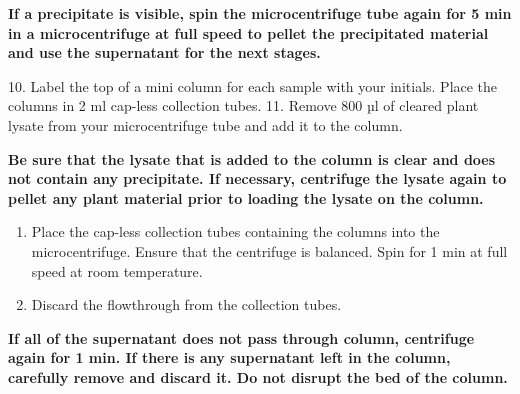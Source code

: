 \documentclass[]{book}
\providecommand{\tightlist}{%
  \setlength{\itemsep}{0pt}\setlength{\parskip}{0pt}}
\theoremstyle{definition}
\theoremstyle{definition}
\theoremstyle{definition}
\theoremstyle{remark}
\let\BeginKnitrBlock\begin \let\EndKnitrBlock\end
\begin{document}
\BeginKnitrBlock{rmdimportant}
\textbf{If a precipitate is visible, spin the microcentrifuge tube again
for 5 min in a microcentrifuge at full speed to pellet the precipitated
material and use the supernatant for the next stages.}
\EndKnitrBlock{rmdimportant} 10. Label the top of a mini column for each
sample with your initials. Place the columns in 2 ml cap-less collection
tubes. 11. Remove 800 µl of cleared plant lysate from your
microcentrifuge tube and add it to the column.

\BeginKnitrBlock{rmdimportant}
\textbf{Be sure that the lysate that is added to the column is clear and
does not contain any precipitate. If necessary, centrifuge the lysate
again to pellet any plant material prior to loading the lysate on the
column.}
\EndKnitrBlock{rmdimportant}

\begin{enumerate}
\def\labelenumi{\arabic{enumi}.}
\setcounter{enumi}{11}
\tightlist
\item
  Place the cap-less collection tubes containing the columns into the
  microcentrifuge. Ensure that the centrifuge is balanced. Spin for 1
  min at full speed at room temperature.
\item
  Discard the flowthrough from the collection tubes.
\end{enumerate}

\BeginKnitrBlock{rmdimportant}
\textbf{If all of the supernatant does not pass through column,
centrifuge again for 1 min. If there is any supernatant left in the
column, carefully remove and discard it. Do not disrupt the bed of the
column.}
\EndKnitrBlock{rmdimportant}
\end{document}
